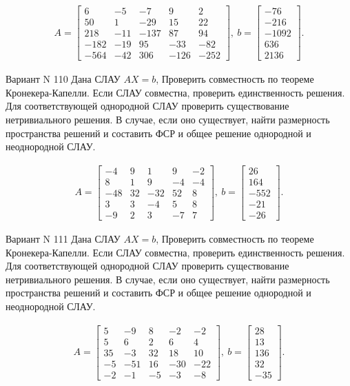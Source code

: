 \documentclass[11pt]{report}
\begin{document}
\begin{align*}
 A = \left[\begin{matrix}6 & -5 & -7 & 9 & 2\\50 & 1 & -29 & 15 & 22\\218 & -11 & -137 & 87 & 94\\-182 & -19 & 95 & -33 & -82\\-564 & -42 & 306 & -126 & -252\end{matrix}\right],
\ b = \left[\begin{matrix}-76\\-216\\-1092\\636\\2136\end{matrix}\right]. 
 \end{align*}

Вариант N 110
Дана СЛАУ $AX = b$,
Проверить совместность по теореме Кронекера-Капелли. Если СЛАУ совместна, проверить единственность решения.
Для соответствующей однородной СЛАУ проверить существование нетривиального решения. В случае, если оно существует,
найти размерность пространства решений и составить ФСР и общее решение однородной  и неоднородной СЛАУ.


\begin{align*}
 A = \left[\begin{matrix}-4 & 9 & 1 & 9 & -2\\8 & 1 & 9 & -4 & -4\\-48 & 32 & -32 & 52 & 8\\3 & 3 & -4 & 5 & 8\\-9 & 2 & 3 & -7 & 7\end{matrix}\right],
\ b = \left[\begin{matrix}26\\164\\-552\\-21\\-26\end{matrix}\right]. 
 \end{align*}

Вариант N 111
Дана СЛАУ $AX = b$,
Проверить совместность по теореме Кронекера-Капелли. Если СЛАУ совместна, проверить единственность решения.
Для соответствующей однородной СЛАУ проверить существование нетривиального решения. В случае, если оно существует,
найти размерность пространства решений и составить ФСР и общее решение однородной  и неоднородной СЛАУ.


\begin{align*}
 A = \left[\begin{matrix}5 & -9 & 8 & -2 & -2\\5 & 6 & 2 & 6 & 4\\35 & -3 & 32 & 18 & 10\\-5 & -51 & 16 & -30 & -22\\-2 & -1 & -5 & -3 & -8\end{matrix}\right],
\ b = \left[\begin{matrix}28\\13\\136\\32\\-35\end{matrix}\right]. 
 \end{align*}
\end{document}
